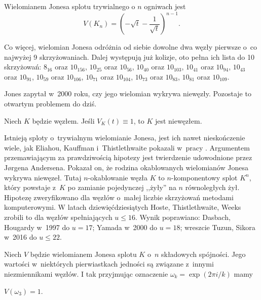 \begin{proposition}
\label{prp:jones_trivial_link}
    Wielomianem Jonesa splotu trywialnego o $n$ ogniwach jest
    \begin{equation}
        V(K_n) = \left(-\sqrt{t} - \frac{1}{\sqrt {t}}\right)^{n-1}.
    \end{equation}
\end{proposition}

Co więcej, wielomian Jonesa odróżnia od siebie dowolne dwa węzły pierwsze o~co najwyżej 9 skrzyżowaniach.
Dalej występują już kolizje, oto pełna ich lista do 10 skrzyżowań: $8_{16}$ oraz $10_{156}$, $10_{25}$ oraz $10_{56}$, $10_{40}$ oraz $10_{103}$, $10_{41}$ oraz $10_{94}$, $10_{43}$ oraz $10_{91}$, $10_{59}$ oraz $10_{106}$, $10_{71}$ oraz $10_{104}$, $10_{73}$ oraz $10_{83}$, $10_{81}$ oraz $10_{109}$.

Jones zapytał w~2000 roku, czy jego wielomian wykrywa niewęzły.
Pozostaje to otwartym problemem do dziś.

\begin{conjecture} \label{jones_conjecture}
    Niech $K$ będzie węzłem.
    Jeśli $V_K(t) \equiv 1$, to $K$ jest niewęzłem.
\end{conjecture}

Istnieją sploty o~trywialnym wielomianie Jonesa, jest ich nawet nieskończenie wiele, jak Eliahou, Kauffman i~Thistlethwaite pokazali w~pracy \cite{eliahou03}.
Argumentem przemawiającym za prawdziwością hipotezy jest twierdzenie udowodnione przez Jørgena Andersena.
Pokazał on, że rodzina okablowanych wielomianów Jonesa wykrywa niewęzeł.
Tutaj $n$-okablowanie węzła $K$ to $n$-komponentowy splot $K^n$, który powstaje z~$K$ po zamianie pojedynczej ,,żyły'' na $n$ równoległych żył.
Hipotezę zweryfikowano dla węzłów o~małej liczbie skrzyżowań metodami komputerowymi.
W latach dziewięćdziesiątych Hoste, Thistlethwaite, Weeks zrobili to dla węzłów spełniających $u \le 16$.
Wynik poprawiano: Dasbach, Hougardy w~1997 do $u = 17$; Yamada w~2000 do $u = 18$; wreszcie Tuzun, Sikora w~2016 do $u \le 22$.

Niech $V$ będzie wielomianem Jonesa splotu $K$ o~$n$ składowych spójności.
Jego wartości w~niektórych pierwiastkach jedności są związane z~innymi niezmiennikami węzłów.
I tak przyjmując oznaczenie $\omega_k = \exp(2\pi i/k)$ mamy

\begin{proposition} \label{jones_sharp_p_hard}
    $V(\omega_3) = 1$.
\end{proposition}

